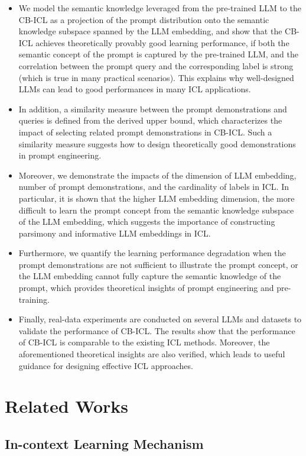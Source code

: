 \documentclass{article} %
\theoremstyle{plain} %
\begin{document}
\begin{itemize}
    \item We model the semantic knowledge leveraged from the pre-trained LLM to the CB-ICL as a projection of the prompt distribution onto the semantic knowledge subspace spanned by the LLM embedding, and show that the CB-ICL achieves theoretically provably good learning performance, if both the semantic concept of the prompt is captured by the pre-trained LLM, and the correlation between the prompt query and the corresponding label is strong (which is true in many practical scenarios). This explains why well-designed LLMs can lead to good performances in many ICL applications. 
    \item In addition, a similarity measure between the prompt demonstrations and queries is defined from the derived upper bound, which characterizes the impact of selecting related prompt demonstrations in CB-ICL. Such a similarity measure suggests how to design theoretically good demonstrations in prompt engineering.
    \item Moreover, we demonstrate the impacts of the dimension of LLM embedding, number of prompt demonstrations, and the cardinality of labels in ICL. In particular, it is shown that the higher LLM embedding dimension, the more difficult to learn the prompt concept from the semantic knowledge subspace of the LLM embedding, which suggests the importance of constructing parsimony and informative LLM embeddings in ICL.
    \item Furthermore, we quantify the learning performance degradation when the prompt demonstrations are not sufficient to illustrate the prompt concept, or the LLM embedding cannot fully capture the semantic knowledge of the prompt, which provides theoretical insights of prompt engineering and pre-training.
    \item Finally, real-data experiments are conducted on several LLMs and datasets to validate the performance of CB-ICL. The results show that the performance of CB-ICL is comparable to the existing ICL methods. Moreover, the aforementioned theoretical insights are also verified, which leads to useful guidance for designing effective ICL approaches.
\end{itemize}

\section{Related Works}
\subsection{In-context Learning Mechanism}
\end{document}
